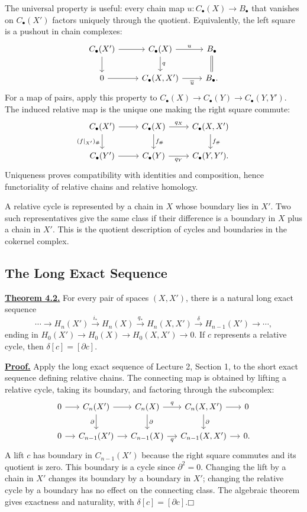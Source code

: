 \documentclass[11pt]{article}
\newcommand{\coursebold}[1]{{\color{burgundy}\textbf{#1}}}
\newcommand{\facehead}[1]{\subsection{#1}}
\begin{document}
The universal property is useful: every chain map $u:C_\bullet(X)\to B_\bullet$ that vanishes on $C_\bullet(X')$ factors uniquely through the quotient. Equivalently, the left square is a pushout in chain complexes:
\[
\begin{tikzcd}
C_\bullet(X')\arrow[r]\arrow[d]&C_\bullet(X)\arrow[r,"u"]\arrow[d,"q"]&B_\bullet\arrow[d,equal]\\
0\arrow[r]&C_\bullet(X,X')\arrow[r,"\overline u"']&B_\bullet.
\end{tikzcd}
\]
For a map of pairs, apply this property to $C_\bullet(X)\to C_\bullet(Y)\to C_\bullet(Y,Y')$. The induced relative map is the unique one making the right square commute:
\[
\begin{tikzcd}
C_\bullet(X')\arrow[r]\arrow[d,"(f|_{X'})_\#"']&C_\bullet(X)\arrow[r,"q_X"]\arrow[d,"f_\#"]&C_\bullet(X,X')\arrow[d,"f_\#"]\\
C_\bullet(Y')\arrow[r]&C_\bullet(Y)\arrow[r,"q_Y"']&C_\bullet(Y,Y').
\end{tikzcd}
\]
Uniqueness proves compatibility with identities and composition, hence functoriality of relative chains and relative homology.

A relative cycle is represented by a chain in $X$ whose boundary lies in $X'$. Two such representatives give the same class if their difference is a boundary in $X$ plus a chain in $X'$. This is the quotient description of cycles and boundaries in the cokernel complex.

\facehead{The Long Exact Sequence}
\hypertarget{thm32}{}\coursebold{\hyperlink{proof32}{Theorem 4.2.}} For every pair of spaces $(X,X')$, there is a natural long exact sequence
\[
\cdots\longrightarrow H_n(X')\xrightarrow{i_*}H_n(X)\xrightarrow{q_*}H_n(X,X')\xrightarrow{\delta}H_{n-1}(X')\longrightarrow\cdots,\tag{2}
\]
ending in $H_0(X')\to H_0(X)\to H_0(X,X')\to0$. If $c$ represents a relative cycle, then $\delta[c]=[\partial c]$.

\hypertarget{proof32}{}\coursebold{\hyperlink{thm32}{Proof.}} Apply the long exact sequence of Lecture 2, Section 1, to the short exact sequence defining relative chains. The connecting map is obtained by lifting a relative cycle, taking its boundary, and factoring through the subcomplex:
\[
\begin{tikzcd}[column sep=small]
0\arrow[r]&C_n(X')\arrow[r]\arrow[d,"\partial"']&C_n(X)\arrow[r,"q"]\arrow[d,"\partial"]&C_n(X,X')\arrow[r]\arrow[d,"\partial"]&0\\
0\arrow[r]&C_{n-1}(X')\arrow[r]&C_{n-1}(X)\arrow[r,"q"']&C_{n-1}(X,X')\arrow[r]&0.
\end{tikzcd}
\]
A lift $c$ has boundary in $C_{n-1}(X')$ because the right square commutes and its quotient is zero. This boundary is a cycle since $\partial^2=0$. Changing the lift by a chain in $X'$ changes its boundary by a boundary in $X'$; changing the relative cycle by a boundary has no effect on the connecting class. The algebraic theorem gives exactness and naturality, with $\delta[c]=[\partial c]$.\hfill$\mdlgwhtsquare$
\end{document}
